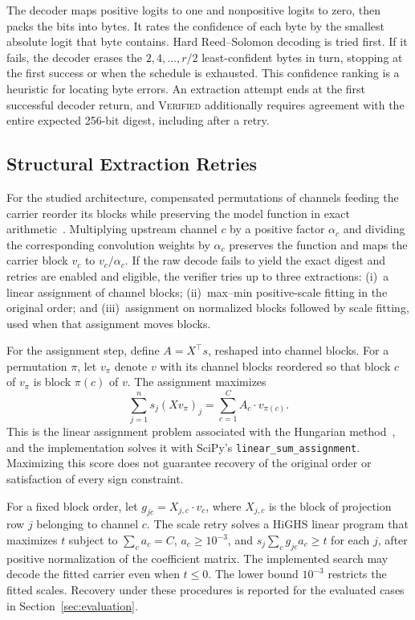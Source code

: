 The decoder maps positive logits to one and nonpositive logits to zero, then packs the bits into bytes. It rates the confidence of each byte by the smallest absolute logit that byte contains. Hard Reed--Solomon decoding is tried first. If it fails, the decoder erases the $2,4,\ldots,r/2$ least-confident bytes in turn, stopping at the first success or when the schedule is exhausted. This confidence ranking is a heuristic for locating byte errors. An extraction attempt ends at the first successful decoder return, and \textsc{Verified} additionally requires agreement with the entire expected 256-bit digest, including after a retry.

\subsection{Structural Extraction Retries}
For the studied architecture, compensated permutations of channels feeding the carrier reorder its blocks while preserving the model function in exact arithmetic~\cite{yan2023rethinking}. Multiplying upstream channel $c$ by a positive factor $\alpha_c$ and dividing the corresponding convolution weights by $\alpha_c$ preserves the function and maps the carrier block $v_c$ to $v_c/\alpha_c$.
If the raw decode fails to yield the exact digest and retries are enabled and eligible, the verifier tries up to three extractions: (i)~a linear assignment of channel blocks; (ii)~max--min positive-scale fitting in the original order; and (iii)~assignment on normalized blocks followed by scale fitting, used when that assignment moves blocks.

For the assignment step, define $A=X^\top s$, reshaped into channel blocks. For a permutation $\pi$, let $v_\pi$ denote $v$ with its channel blocks reordered so that block $c$ of $v_\pi$ is block $\pi(c)$ of $v$.
The assignment maximizes
\begin{equation}
 \sum_{j=1}^{n}s_j(Xv_\pi)_j
    =\sum_{c=1}^{C} A_c\cdot v_{\pi(c)}.
 \label{eq:assignment}
\end{equation}
This is the linear assignment problem associated with the Hungarian method~\cite{kuhn1955hungarian}, and the implementation solves it with SciPy's \texttt{linear\_sum\_assignment}. Maximizing this score does not guarantee recovery of the original order or satisfaction of every sign constraint.

For a fixed block order, let $g_{jc}=X_{j,c}\cdot v_c$, where $X_{j,c}$ is the block of projection row $j$ belonging to channel $c$. The scale retry solves a HiGHS linear program that maximizes $t$ subject to $\sum_c a_c=C$, $a_c\ge10^{-3}$, and $s_j\sum_c g_{jc}a_c\ge t$ for each $j$, after positive normalization of the coefficient matrix. The implemented search may decode the fitted carrier even when $t\le 0$. The lower bound $10^{-3}$ restricts the fitted scales. Recovery under these procedures is reported for the evaluated cases in Section~\ref{sec:evaluation}.

